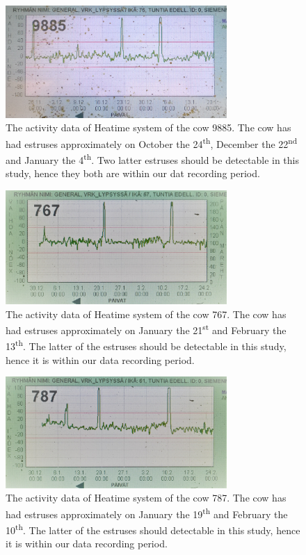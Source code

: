 \documentclass[english,12pt,a4paper,pdftex,elec,utf8]{aaltothesis}
\begin{document}
\begin{figure}[htb]
\centering
\includegraphics[width = 0.75\textwidth]{figures/heatime_kiima_9885}
\caption{The activity data of Heatime system of the cow 9885. The cow has had estruses approximately on October the 24\textsuperscript{th}, December the 22\textsuperscript{nd} and January the 4\textsuperscript{th}. Two latter estruses should be detectable in this study, hence they both are within our dat recording period. }
\label{heatime_kiima_9885}
\end{figure}




\begin{figure}[htb]
\centering
\includegraphics[width = 0.75\textwidth]{figures/heatime_kiima_767}
\caption{The activity data of Heatime system of the cow 767. The cow has had estruses approximately on January the 21\textsuperscript{st} and February the 13\textsuperscript{th}. The latter of the estruses should be detectable in this study, hence it is within our data recording period.}
\label{heatime_kiima_767}
\end{figure}

\begin{figure}[htb]
\centering
\includegraphics[width = 0.75\textwidth]{figures/heatime_kiima_787}
\caption{The activity data of Heatime system of the cow 787. The cow has had estruses approximately on January the 19\textsuperscript{th} and February the 10\textsuperscript{th}. The latter of the estruses should detectable in this study, hence it is within our data recording period.}
\label{heatime_kiima_787}
\end{figure}
\end{document}
